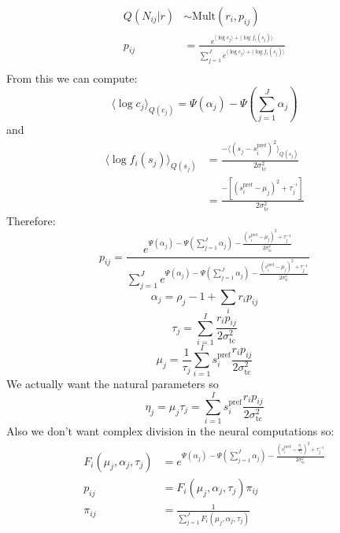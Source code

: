 \documentclass[12pt]{article}
\begin{document}
\begin{equation}
\begin{aligned}
Q(N_{ij}|r) &\sim \text{Mult}(r_i, p_{ij})\\
p_{ij} &= \frac{e^{\langle \log c_j \rangle + \langle \log f_i(s_j) \rangle}}{\sum_{j=1}^J e^{\langle \log c_j \rangle + \langle \log f_i(s_j) \rangle}}\\
\end{aligned}
\end{equation}
From this we can compute:
\begin{equation}
\langle \log c_j \rangle_{Q(c_j)}= \Psi(\alpha_j) - \Psi(\sum_{j=1}^J \alpha_j)
\end{equation}
and
\begin{equation}
\begin{aligned}
\langle \log f_i(s_j) \rangle_{Q(s_j)} &= \frac{-\langle (s_j - s_i^{\text{pref}})^2 \rangle_{Q(s_j)}}{2 \sigma_{\text{tc}}^2}\\
&=  \frac{-[(s_i^{\text{pref}} - \mu_j)^2 + \tau_j^{^{-1}}]}{2 \sigma_{\text{tc}}^2}
\end{aligned}
\end{equation}
Therefore: 
\begin{equation}
p_{ij} = \frac{e^{\Psi(\alpha_j) - \Psi(\sum_{j=1}^J \alpha_j) - \frac{(s_i^{\text{pref}} - \mu_j)^2 + \tau_j^{-1}}{2 \sigma_{\text{tc}}^2}}}{\sum_{j=1}^J e^{\Psi(\alpha_j) - \Psi(\sum_{j=1}^J \alpha_j) - \frac{(s_i^{\text{pref}} - \mu_j)^2 + \tau_j^{-1}}{2 \sigma_{\text{tc}}^2}}}
\end{equation}
\begin{equation}
\alpha_j = \rho_j - 1 + \sum_i r_i p_{ij}
\end{equation}
\begin{equation}
\tau_j = \sum_{i=1}^I \frac{r_i p_{ij}}{2 \sigma_{\text{tc}}^2}
\end{equation}
\begin{equation}
\mu_j = \frac{1}{\tau_j} \sum_{i=1}^I s_i^{\text{pref}} \frac{r_i p_{ij}}{2 \sigma_{\text{tc}}^2}
\end{equation}
We actually want the natural parameters so 
\begin{equation}
\eta_j = \mu_j \tau_j = \sum_{i=1}^I s_i^{\text{pref}} \frac{r_i p_{ij}}{2 \sigma_{\text{tc}}^2}
\end{equation}
Also we don't want complex division in the neural computations so:
\begin{equation}
\begin{aligned}
F_i(\mu_j, \alpha_j, \tau_j) &= e^{\Psi(\alpha_j) - \Psi(\sum_{j=1}^J \alpha_j) - \frac{(s_i^{\text{pref}} - \frac{\eta_j}{\tau_j})^2 + \tau_j^{-1}}{2 \sigma_{\text{tc}}^2}}\\
p_{ij} &= F_i(\mu_j, \alpha_j, \tau_j) \pi_{ij}\\
\pi_{ij} &= \frac{1}{\sum_{j=1}^J F_i(\mu_j, \alpha_j, \tau_j)}
\end{aligned}
\end{equation}
\end{document}
